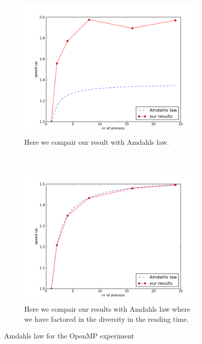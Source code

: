 \documentclass[a4paper,10pt]{article}
\begin{document}
\begin{figure}[h!t]
        \centering
        \begin{subfigure}[b]{0.70\textwidth}
                \centering
                \includegraphics[width=\textwidth]{graphics/openmp17gb/Amdahls_law.png}
                \caption{Here we compair our result with Amdahls law.}
                \label{fig:openmp_amad1}
        \end{subfigure}%
        \\
        \begin{subfigure}[b]{0.70\textwidth}
                \centering
                \includegraphics[width=\textwidth]{graphics/openmp17gb/Amdahls_law2.png}
                \caption{Here we compair our results with Amdahls law where we have factored in
                         the diversity in the reading time.}
                \label{fig:openmp_amad2}
        \end{subfigure}
        \caption{Amdahls law for the OpenMP experiment}
\end{figure}
\end{document}
